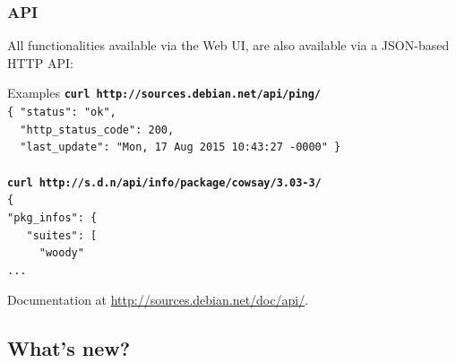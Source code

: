 \documentclass{beamer}
\begin{document}
\begin{frame}
  \frametitle{API}
  All functionalities available via the Web UI, are also available via a
  JSON-based HTTP API:
  \begin{block}{Examples}
    \texttt{\textbf{curl http://sources.debian.net/api/ping/}\\
      \{
        "status": "ok",\\
        ~~"http\_status\_code": 200,\\
        ~~"last\_update": "Mon, 17 Aug 2015 10:43:27 -0000"
      \}}
    \\ ~ \\
    \texttt{\textbf{curl
        http://s.d.n/api/info/package/cowsay/3.03-3/}\\
      \{\\
        "pkg\_infos": \{\\
        ~~  "suites": [\\
        ~~~~      "woody"\\
      ...}
  \end{block}
  Documentation at \url{http://sources.debian.net/doc/api/}.
\end{frame}

\subsection{What's new?}
\end{document}
